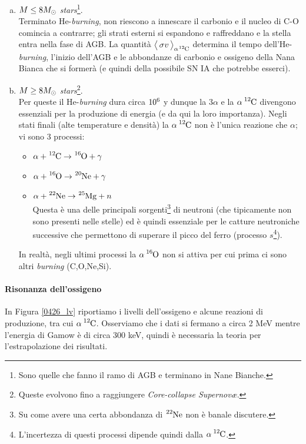 \begin{enumerate}[a)]
	\item $M\leq 8 M_{\odot}$ \textit{stars}\footnote{Sono quelle che fanno il ramo di AGB e terminano in Nane Bianche.}.\\ 
	Terminato He-\textit{burning}, non riescono a innescare il carbonio e il nucleo di C-O comincia a contrarre; gli strati esterni si espandono e raffreddano e la stella entra nella fase di AGB. La quantità $\mean{\sigma v}_{\alpha\ce{^{12}C}}$ determina il tempo dell'He-\textit{burning}, l'inizio dell'AGB e le abbondanze di carbonio e ossigeno della Nana Bianca che si formerà (e quindi della possibile SN IA che potrebbe esserci).  
	\item $M\geq 8M_{\odot}$ \textit{stars}\footnote{Queste evolvono fino a raggiungere \textit{Core-collapse Supernov\ae}.}.\\ 
	Per queste il He-\textit{burning} dura circa $10^{6}$ y dunque la $3\alpha$ e la $\alpha\,\ce{^{12}C}$ divengono essenziali per la produzione di energia (e da qui la loro importanza). Negli stati finali (alte temperature e densità) la $\alpha\,\ce{^{12}C}$ non è l'unica reazione che  $\alpha$; vi sono 3 processi:
	\begin{itemize}
		\item $\alpha + \ce{^{12}C} \to \ce{^{16}O} + \gamma$ 
		\item $\alpha + \ce{^{16}O} \to \ce{^{20}Ne} + \gamma $
		\item $\alpha + \ce{^{22}Ne} \to \ce{^{25}Mg} + n$\\ 
		Questa è una delle principali sorgenti\footnote{Su come avere una certa abbondanza di $\ce{^{22}Ne}$ non è banale discutere.} di neutroni (che tipicamente non sono presenti nelle stelle) ed è quindi essenziale per le catture neutroniche successive che permettono di superare il picco del ferro (processo $s$\footnote{L'incertezza di questi processi dipende quindi dalla $\alpha \, \ce{^{12}C}$.}).
	\end{itemize} 
	In realtà, negli ultimi processi la $\alpha \, \ce{^{16}O}$ non si attiva per cui prima ci sono altri \textit{burning} (C,O,Ne,Si).
\end{enumerate} 

\paragraph{Risonanza dell'ossigeno} 
In Figura \ref{0426_lv} riportiamo i livelli dell'ossigeno e alcune reazioni di produzione, tra cui $\alpha \, \ce{^{12}C}$. Osserviamo che i dati si fermano a circa 2 MeV mentre l'energia di Gamow è di circa 300 keV, quindi è necessaria la teoria per l'estrapolazione dei risultati.

